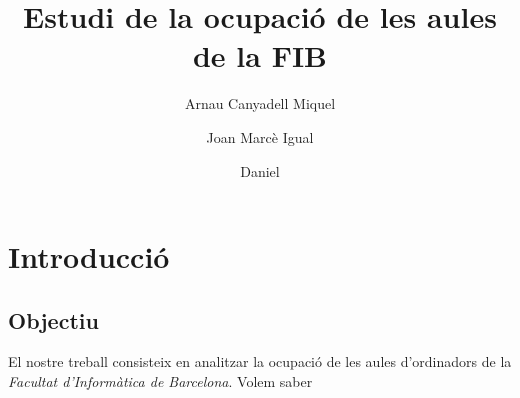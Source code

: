 \documentclass{article}
\begin{document}
\title{Estudi de la ocupació de les aules de la FIB}
\author{Arnau Canyadell Miquel \and Joan Marcè Igual \and Daniel}

\maketitle
\newpage
\tableofcontents

\newpage
\section{Introducció}

\subsection{Objectiu}

El nostre treball consisteix en analitzar la ocupació de les aules d'ordinadors de la \emph{Facultat d'Informàtica de Barcelona}. Volem saber 
\end{document}
